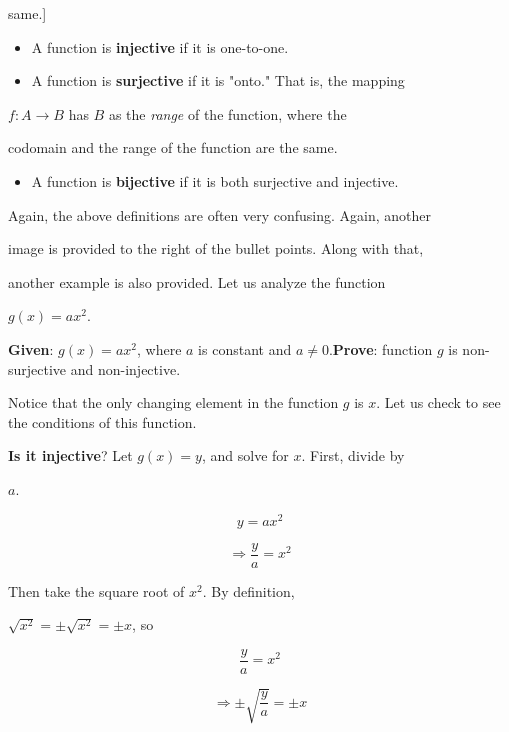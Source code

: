 same.]



\begin{itemize}
    \item A function is \textbf{injective} if it is one-to-one.
    \item A function is \textbf{surjective} if it is "onto." That is, the mapping
\end{itemize}
    $f:A\to B$ has $B$ as the \textit{range} of the function, where the

    codomain and the range of the function are the same.

\begin{itemize}
    \item A function is \textbf{bijective} if it is both surjective and injective.
\end{itemize}

Again, the above definitions are often very confusing. Again, another

image is provided to the right of the bullet points. Along with that,

another example is also provided. Let us analyze the function

$g(x)=ax^{2}$.



\textbf{Given}: $g(x)=ax^{2}$, where $a$ is constant and $a\ne0$.\textbf{Prove}: function $g$ is non-surjective and non-injective.



Notice that the only changing element in the function $g$ is $x$. Let us check to see the conditions of this function.



\textbf{Is it injective}? Let $g(x)=y$, and solve for $x$. First, divide by

$a$.



$$y=ax^{2}$$



$$\Rightarrow \frac{y}{a}=x^{2}$$



Then take the square root of $x^2$. By definition,

$\sqrt{x^{2}}=\pm\sqrt{x^{2}}=\pm x$, so



$$\frac{y}{a}=x^{2}$$



$$\Rightarrow\pm\sqrt{\frac{y}{a}}=\pm x$$



